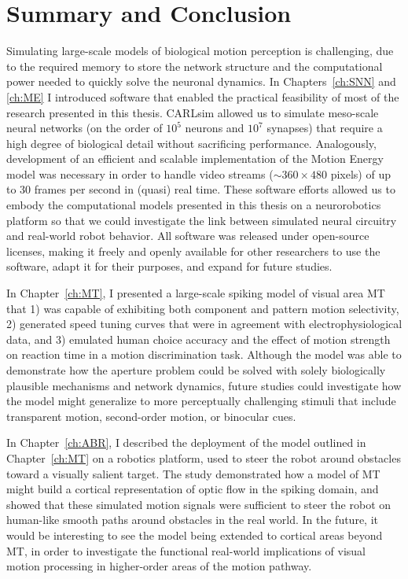 \chapter{Summary and Conclusion}
\label{ch:conclusion}

Simulating large-scale models of biological motion
perception is challenging, due to the required memory to store
the network structure and the computational power needed to
quickly solve the neuronal dynamics.
In Chapters~\ref{ch:SNN} and \ref{ch:ME} I introduced software that
enabled the practical feasibility of most of the research presented in
this thesis.
CARLsim allowed us to simulate meso-scale neural networks 
(on the order of $10^5$ neurons and $10^7$ synapses) that require 
a high degree of biological detail without sacrificing performance.
Analogously, development of an efficient and scalable implementation of
the Motion Energy model \citep{SimoncelliHeeger1998} was necessary in order
to handle video streams ($\sim 360 \times 480$ pixels) of up to 
$30$ frames per second in (quasi) real time.
These software efforts allowed us to embody the computational models
presented in this thesis on a neurorobotics platform so that we could
investigate the link between simulated neural circuitry and real-world
robot behavior.
All software was released under open-source licenses,
making it freely and openly available for other researchers to use the
software, adapt it for their purposes, and expand for future studies.

In Chapter~\ref{ch:MT}, I presented a large-scale spiking model 
of visual area \ac{MT} that 1) was capable of exhibiting both component and
pattern motion selectivity, 2) generated speed tuning curves that were in
agreement with electrophysiological data, 
and 3) emulated human choice accuracy and the effect of motion strength 
on reaction time in a motion discrimination task.
Although the model was able to demonstrate how the aperture problem could
be solved with solely biologically plausible mechanisms and network dynamics,
future studies could investigate how the model might generalize to more
perceptually challenging stimuli that include transparent motion,
second-order motion, or binocular cues.

In Chapter~\ref{ch:ABR}, I described the deployment of the model outlined
in Chapter~\ref{ch:MT} on a robotics platform, used to steer the robot
around obstacles toward a visually salient target.
The study demonstrated how a model of \ac{MT} might build a cortical
representation of optic flow in the spiking domain, and showed that these
simulated motion signals were sufficient to steer the robot on human-like
smooth paths around obstacles in the real world.
In the future, it would be interesting to see the model being extended
to cortical areas beyond \ac{MT}, in order to investigate the functional
real-world implications of visual motion processing in higher-order areas
of the motion pathway.

